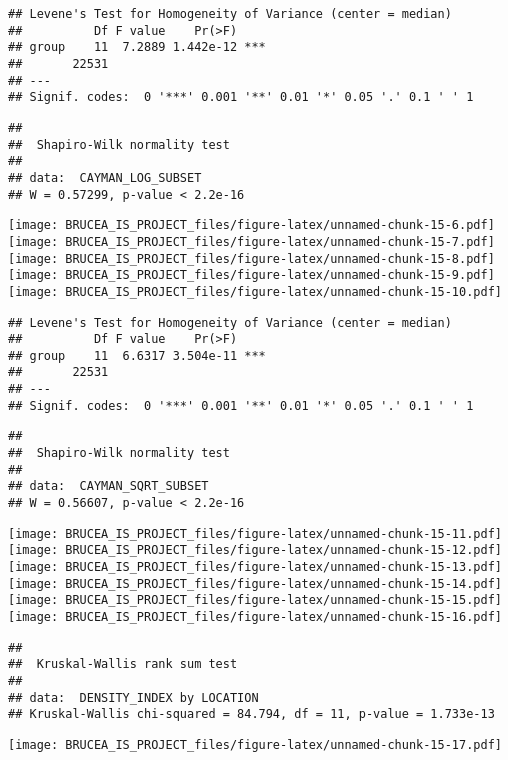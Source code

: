 \documentclass[
]{article}
\begin{document}
\begin{verbatim}
## Levene's Test for Homogeneity of Variance (center = median)
##          Df F value    Pr(>F)    
## group    11  7.2889 1.442e-12 ***
##       22531                      
## ---
## Signif. codes:  0 '***' 0.001 '**' 0.01 '*' 0.05 '.' 0.1 ' ' 1
\end{verbatim}

\begin{verbatim}
## 
##  Shapiro-Wilk normality test
## 
## data:  CAYMAN_LOG_SUBSET
## W = 0.57299, p-value < 2.2e-16
\end{verbatim}

\texttt{[image: BRUCEA\_IS\_PROJECT\_files/figure-latex/unnamed-chunk-15-6.pdf]}
\texttt{[image: BRUCEA\_IS\_PROJECT\_files/figure-latex/unnamed-chunk-15-7.pdf]}
\texttt{[image: BRUCEA\_IS\_PROJECT\_files/figure-latex/unnamed-chunk-15-8.pdf]}
\texttt{[image: BRUCEA\_IS\_PROJECT\_files/figure-latex/unnamed-chunk-15-9.pdf]}
\texttt{[image: BRUCEA\_IS\_PROJECT\_files/figure-latex/unnamed-chunk-15-10.pdf]}

\begin{verbatim}
## Levene's Test for Homogeneity of Variance (center = median)
##          Df F value    Pr(>F)    
## group    11  6.6317 3.504e-11 ***
##       22531                      
## ---
## Signif. codes:  0 '***' 0.001 '**' 0.01 '*' 0.05 '.' 0.1 ' ' 1
\end{verbatim}

\begin{verbatim}
## 
##  Shapiro-Wilk normality test
## 
## data:  CAYMAN_SQRT_SUBSET
## W = 0.56607, p-value < 2.2e-16
\end{verbatim}

\texttt{[image: BRUCEA\_IS\_PROJECT\_files/figure-latex/unnamed-chunk-15-11.pdf]}
\texttt{[image: BRUCEA\_IS\_PROJECT\_files/figure-latex/unnamed-chunk-15-12.pdf]}
\texttt{[image: BRUCEA\_IS\_PROJECT\_files/figure-latex/unnamed-chunk-15-13.pdf]}
\texttt{[image: BRUCEA\_IS\_PROJECT\_files/figure-latex/unnamed-chunk-15-14.pdf]}
\texttt{[image: BRUCEA\_IS\_PROJECT\_files/figure-latex/unnamed-chunk-15-15.pdf]}
\texttt{[image: BRUCEA\_IS\_PROJECT\_files/figure-latex/unnamed-chunk-15-16.pdf]}

\begin{verbatim}
## 
##  Kruskal-Wallis rank sum test
## 
## data:  DENSITY_INDEX by LOCATION
## Kruskal-Wallis chi-squared = 84.794, df = 11, p-value = 1.733e-13
\end{verbatim}

\texttt{[image: BRUCEA\_IS\_PROJECT\_files/figure-latex/unnamed-chunk-15-17.pdf]}
\end{document}
